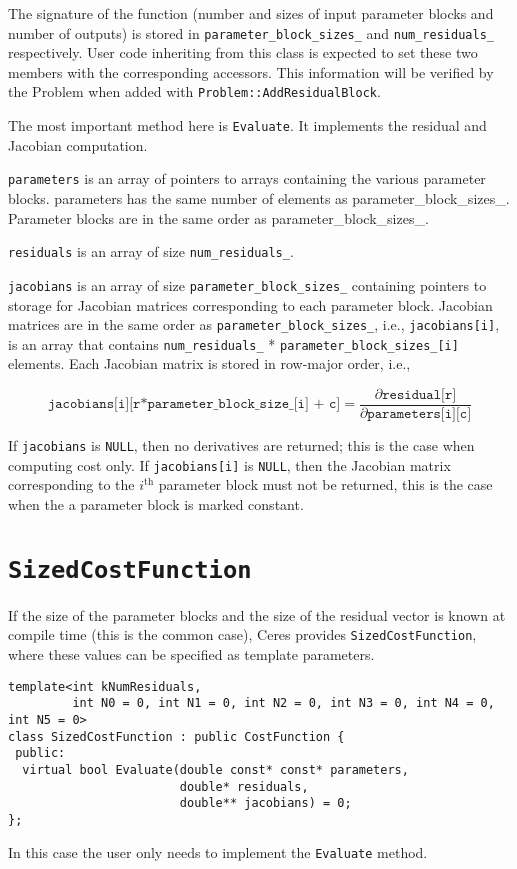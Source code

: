 The signature of the function (number and sizes of input parameter blocks and number of outputs)
is stored in \texttt{parameter\_block\_sizes\_} and \texttt{num\_residuals\_} respectively. User
code inheriting from this class is expected to set these two members with the
corresponding accessors. This information will be verified by the Problem
when added with \texttt{Problem::AddResidualBlock}. 

The most important method here is \texttt{Evaluate}. It implements the residual and Jacobian computation.

\texttt{parameters}  is an array of pointers to arrays containing the various parameter blocks. parameters has the same number of elements as parameter\_block\_sizes\_.  Parameter blocks are in the same order as parameter\_block\_sizes\_. 


\texttt{residuals} is an array of size \texttt{num\_residuals\_}. 


\texttt{jacobians} is an array of size \texttt{parameter\_block\_sizes\_} containing pointers to storage for Jacobian matrices corresponding to each parameter block. Jacobian matrices are in the same order as \texttt{parameter\_block\_sizes\_}, i.e., \texttt{jacobians[i]}, is an array that contains \texttt{num\_residuals\_} * \texttt{parameter\_block\_sizes\_[i]} elements. Each Jacobian matrix is stored in row-major order, i.e.,
 
\begin{equation}
\texttt{jacobians[i][r*parameter\_block\_size\_[i] + c]} = \frac{\partial \texttt{residual[r]}}{\partial \texttt{parameters[i][c]}}
\end{equation}

If \texttt{jacobians} is \texttt{NULL}, then no derivatives are returned; this is the case when computing cost only. If \texttt{jacobians[i]} is \texttt{NULL}, then the Jacobian matrix corresponding to the $i^{\textrm{th}}$ parameter block must not be returned, this is the case when the a parameter block is marked constant.

\section{\texttt{SizedCostFunction}}
If the size of the parameter blocks and the size of the residual vector is known at compile time (this is the common case), Ceres provides \texttt{SizedCostFunction}, where these values can be specified as template parameters.
\begin{verbatim}
template<int kNumResiduals,
         int N0 = 0, int N1 = 0, int N2 = 0, int N3 = 0, int N4 = 0, int N5 = 0>
class SizedCostFunction : public CostFunction {
 public:
  virtual bool Evaluate(double const* const* parameters,
                        double* residuals,
                        double** jacobians) = 0;
};
\end{verbatim}
In this case the user only needs to implement the \texttt{Evaluate} method.

